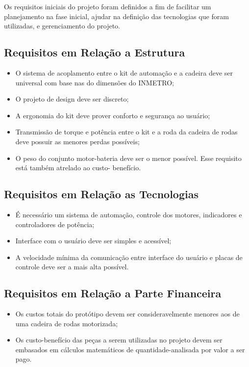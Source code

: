 Os requisitos iniciais do projeto foram definidos a fim de facilitar um planejamento na fase inicial, ajudar na definição das tecnologias que foram utilizadas, e gerenciamento do projeto.

\subsection{Requisitos em Relação a Estrutura}

  \begin{itemize}
    \item O sistema de acoplamento entre o kit de automação e a cadeira deve ser universal com base nas do dimensões do INMETRO;
    \item O projeto de design deve ser discreto;
    \item A ergonomia do kit deve prover conforto e segurança ao usuário;
    \item Transmissão de torque e potência entre o kit e a roda da cadeira de rodas deve possuir as menores perdas possíveis;
    \item O peso do conjunto motor-bateria deve ser o menor possível. Esse requisito está também atrelado ao custo- benefício.

  \end{itemize}

\subsection{Requisitos em Relação as Tecnologias}

  \begin{itemize}
    \item É necessário um sistema de automação, controle dos motores, indicadores e controladores de potência;
    \item Interface com o usuário deve ser simples e acessível;
    \item A velocidade mínima da comunicação entre interface do usuário e placas de controle deve ser a mais alta possível.
  \end{itemize}

\subsection{Requisitos em Relação a Parte Financeira}
  \begin{itemize}
    \item Os custos totais do protótipo devem ser consideravelmente menores aos de uma cadeira de rodas motorizada;
    \item Os custo-benefício das peças a serem utilizadas no projeto devem ser embasados em cálculos matemáticos de quantidade-analisada por valor a ser pago.
  \end{itemize}
